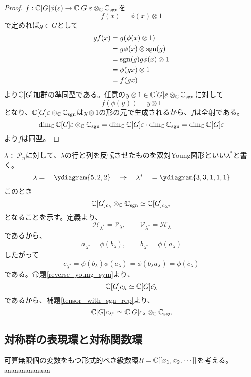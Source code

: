 \documentclass{ltjsarticle}
\begin{document}
\begin{proof}
  $f:\mathbb{C}[G]\phi(\varepsilon)\rightarrow\mathbb{C}[G]\varepsilon\otimes_{\mathbb{C}} \mathbb{C}_{\mathrm{sgn}}$を
  \[
  f(x)=\phi(x)\otimes 1  
  \]
  で定めれば$g\in G$として
  \begin{align*}
    gf(x)
    &=g(\phi(x)\otimes 1)\\
    &=g\phi(x)\otimes \mathrm{sgn}(g)\\
    &=\mathrm{sgn}(g)g\phi(x)\otimes 1\\
    &=\phi(gx)\otimes 1\\
    &=f(gx)
  \end{align*}
  より$\mathbb{C}[G]$加群の準同型である。任意の$y\otimes 1\in \mathbb{C}[G]\varepsilon\otimes_{\mathbb{C}} \mathbb{C}_{\mathrm{sgn}}$に対して
  \[
  f(\phi(y))=y\otimes 1  
  \]
  となり、$\mathbb{C}[G]\varepsilon\otimes_{\mathbb{C}} \mathbb{C}_{\mathrm{sgn}}$は$y\otimes 1$の形の元で生成されるから、$f$は全射である。
  \[
  \dim_{\mathbb{C}}\mathbb{C}[G]\varepsilon\otimes_{\mathbb{C}} \mathbb{C}_{\mathrm{sgn}}=\dim_{\mathbb{C}}\mathbb{C}[G]\varepsilon\cdot\dim_{\mathbb{C}}\mathbb{C}_{\mathrm{sgn}}=  \dim_{\mathbb{C}}\mathbb{C}[G]\varepsilon 
  \]
  より$f$は同型。
\end{proof}


\begin{eg}
  $\lambda\in\mathcal{P}_n$に対して、$\lambda$の行と列を反転させたものを双対Young図形といい$\lambda^*$と書く。
  \[
  \lambda=\quad\ydiagram{5,2,2}\quad\rightarrow\quad\lambda^*\quad=\ydiagram{3,3,1,1,1}
  \]
  このとき
  \[
  \mathbb{C}[G]_{c_\lambda}\otimes_{\mathbb{C}}\mathbb{C}_{\mathrm{sgn}}\simeq \mathbb{C}[G]_{c_{\lambda^*}}
  \]
  となることを示す。定義より、
  \[
  \mathcal{H}_{\lambda^*}=\mathcal{V}_{\lambda},\qquad
  \mathcal{V}_{\lambda^*}=\mathcal{H}_{\lambda}  
  \]
  であるから、
  \[
  a_{\lambda^*}=\phi(b_{\lambda}),\qquad b_{\lambda^*}=\phi(a_{\lambda})
  \]
  したがって
  \[
  c_{\lambda^*}=\phi(b_\lambda)\phi(a_\lambda)=\phi(b_\lambda a_\lambda)=\phi(\tilde{c_\lambda})  
  \]
  である。命題\ref{reverse_young_sym}より、
  \[
  \mathbb{C}[G]c_\lambda\simeq \mathbb{C}[G]\tilde{c_\lambda}  
  \]
  であるから、補題\ref{tensor_with_sgn_rep}より、
  \[
  \mathbb{C}[G]c_{\lambda^*}\simeq \mathbb{C}[G]c_\lambda\otimes_{\mathbb{C}}\mathbb{C}_{\mathrm{sgn}}  
  \]
\end{eg}


\subsection{対称群の表現環と対称関数環}

\begin{defin}
  可算無限個の変数をもつ形式的べき級数環$R=\mathbb{C}[[x_1,x_2,\cdots]]$を考える。aaaaaaaaaaaaa
\end{defin}
\end{document}
